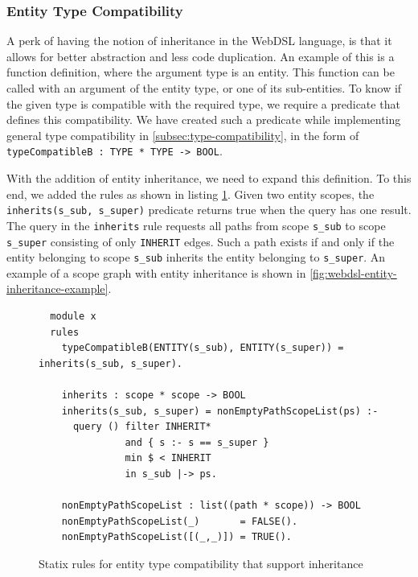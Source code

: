     \subsubsection{Entity Type Compatibility}

      A perk of having the notion of inheritance in the WebDSL language, is that it allows for better abstraction and less code duplication. An example of this is a function definition, where the argument type is an entity. This function can be called with an argument of the entity type, or one of its sub-entities. To know if the given type is compatible with the required type, we require a predicate that defines this compatibility. We have created such a predicate while implementing general type compatibility in \cref{subsec:type-compatibility}, in the form of \lstinline|typeCompatibleB : TYPE * TYPE -> BOOL|.

      With the addition of entity inheritance, we need to expand this definition. To this end, we added the rules as shown in listing \cref{fig:entity-type-compatibility-inheritance}. Given two entity scopes, the \texttt{inherits(s\_sub, s\_super)} predicate returns true when the query has one result. The query in the \texttt{inherits} rule requests all paths from scope \texttt{s\_sub} to scope \texttt{s\_super} consisting of only \texttt{INHERIT} edges. Such a path exists if and only if the entity belonging to scope \texttt{s\_sub} inherits the entity belonging to \texttt{s\_super}. An example of a scope graph with entity inheritance is shown in \cref{fig:webdsl-entity-inheritance-example}.

      \begin{figure}
        \begin{verbatim}
  module x
  rules
    typeCompatibleB(ENTITY(s_sub), ENTITY(s_super)) = inherits(s_sub, s_super).

    inherits : scope * scope -> BOOL
    inherits(s_sub, s_super) = nonEmptyPathScopeList(ps) :-
      query () filter INHERIT*
               and { s :- s == s_super }
               min $ < INHERIT
               in s_sub |-> ps.

    nonEmptyPathScopeList : list((path * scope)) -> BOOL
    nonEmptyPathScopeList(_)       = FALSE().
    nonEmptyPathScopeList([(_,_)]) = TRUE().
        \end{verbatim}
        \caption{\label{fig:entity-type-compatibility-inheritance}Statix rules for entity type compatibility that support inheritance}
      \end{figure}

